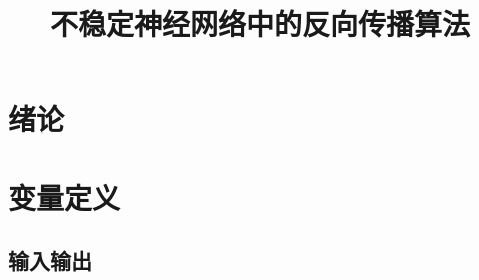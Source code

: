 \documentclass[12pt,a4paper]{amsart}
\title{不稳定神经网络中的反向传播算法}
\begin{document}
\maketitle

\section{绪论}

\section{变量定义}

\subsection{输入输出}
\end{document}
